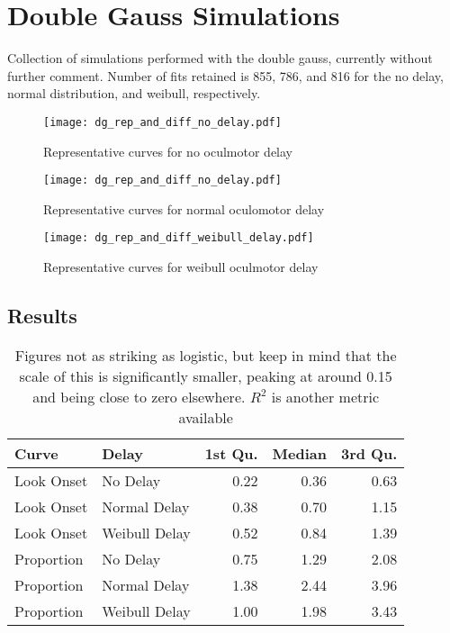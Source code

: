 \section{Double Gauss Simulations}

Collection of simulations performed with the double gauss, currently without further comment. Number of fits retained is 855, 786, and 816 for the no delay, normal distribution, and weibull, respectively.


\begin{figure}[H]
\centering
\texttt{[image: dg\_rep\_and\_diff\_no\_delay.pdf]}
\caption{Representative curves for no oculmotor delay}
\label{fig:dg_rep_curves_no_delay}
\end{figure}

\begin{figure}[H]
\centering
\texttt{[image: dg\_rep\_and\_diff\_no\_delay.pdf]}
\caption{Representative curves for normal oculomotor delay}
\label{fig:dg_rep_curves_normal_delay}
\end{figure}


\begin{figure}[H]
\centering
\texttt{[image: dg\_rep\_and\_diff\_weibull\_delay.pdf]}
\caption{Representative curves for weibull oculmotor delay}
\label{fig:dg_rep_curves_weibull_delay}
\end{figure}



\subsection{Results}

\begin{table}[ht]
\centering
\begin{tabular}{llrrr}
  \hline
Curve & Delay & 1st Qu. & Median & 3rd Qu. \\ 
  \hline
Look Onset & No Delay & 0.22 & 0.36 & 0.63 \\ 
  Look Onset & Normal Delay & 0.38 & 0.70 & 1.15 \\ 
  Look Onset & Weibull Delay & 0.52 & 0.84 & 1.39 \\ 
  Proportion & No Delay & 0.75 & 1.29 & 2.08 \\ 
  Proportion & Normal Delay & 1.38 & 2.44 & 3.96 \\ 
  Proportion & Weibull Delay & 1.00 & 1.98 & 3.43 \\ 
   \hline
\end{tabular}
\caption{Figures not as striking as logistic, but keep in mind that the scale of this is significantly smaller, peaking at around 0.15 and being close to zero elsewhere. $R^2$ is another metric available}
\label{tab:dg_mise_sims}
\end{table}

